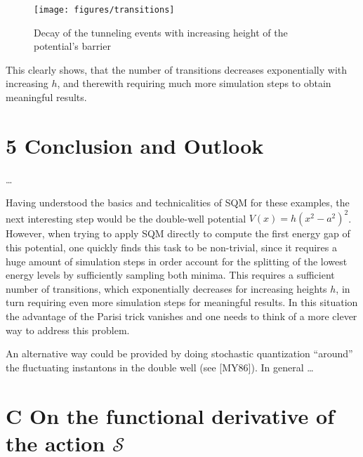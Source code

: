 \documentclass[11pt,a4paper]{scrartcl}
\newcommand{\action}{\ensuremath{\mathcal{S}}}
\begin{document}
\begin{figure}[h]
    \centering
    \texttt{[image: figures/transitions]}
    \caption{Decay of the tunneling events with increasing height of the potential's barrier}
    \label{fig:transitions}
\end{figure}

This clearly shows, that the number of transitions decreases exponentially with
increasing $h$, and therewith requiring much more simulation steps to obtain
meaningful results.


\section*{5 Conclusion and Outlook}
\dots

Having understood the basics and technicalities of SQM for these
examples, the next interesting step would be the double-well potential
$V(x)=h\left(x^2-a^2\right)^2$.
However, when trying to apply SQM directly to compute the first energy gap of
this potential, one quickly finds this task to be non-trivial, since it
requires a huge amount of simulation steps in order account for the splitting
of the lowest energy levels by sufficiently sampling both minima. This requires
a sufficient number of transitions, which exponentially decreases for
increasing heights $h$, in turn requiring even more simulation steps for
meaningful results. In this situation the advantage of the Parisi trick
vanishes and one needs to think of a more clever way to address this problem.

An alternative way could be provided by doing stochastic quantization
\enquote{around} the fluctuating instantons in the double well (see [MY86]). In general \dots




\section*{C On the functional derivative of the action \action}
\end{document}
